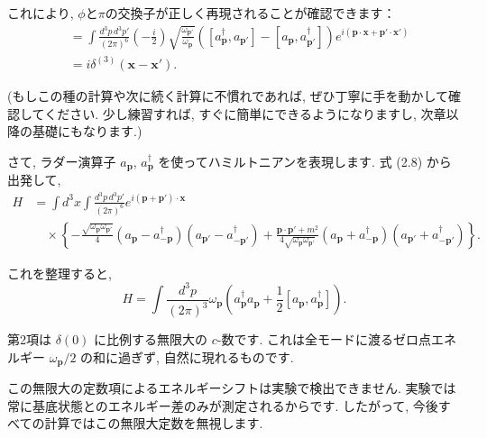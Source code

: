 \documentclass[a4paper,12pt]{article}
\begin{document}
これにより, $\phi$と$\pi$の交換子が正しく再現されることが確認できます：
\begin{align*}
[\phi(\mathbf{x}), \pi(\mathbf{x}')] &= \int \frac{d^3p\, d^3p'}{(2\pi)^6} \left( -\frac{i}{2} \right) \sqrt{\frac{\omega_{\mathbf{p}'}}{\omega_{\mathbf{p}}}}
\left( [a^\dagger_{\mathbf{p}}, a_{\mathbf{p}'}] - [a_{\mathbf{p}}, a^\dagger_{\mathbf{p}'}] \right)
e^{i(\mathbf{p}\cdot\mathbf{x} + \mathbf{p}'\cdot\mathbf{x}')} \\
&= i\delta^{(3)}(\mathbf{x} - \mathbf{x}') .
\end{align*}

(もしこの種の計算や次に続く計算に不慣れであれば, ぜひ丁寧に手を動かして確認してください.  
少し練習すれば, すぐに簡単にできるようになりますし, 次章以降の基礎にもなります.)

\vspace{0.5em}

さて, ラダー演算子 $a_{\mathbf{p}}$, $a^\dagger_{\mathbf{p}}$ を使ってハミルトニアンを表現します.  
式 (2.8) から出発して,
\begin{align*}
H &= \int d^3x \int \frac{d^3p\, d^3p'}{(2\pi)^6} e^{i(\mathbf{p}+\mathbf{p}')\cdot\mathbf{x}} \\
&\quad \times \left\{ -\frac{\sqrt{\omega_{\mathbf{p}}\omega_{\mathbf{p}'}}}{4} (a_{\mathbf{p}} - a^\dagger_{-\mathbf{p}})(a_{\mathbf{p}'} - a^\dagger_{-\mathbf{p}'})
+ \frac{\mathbf{p}\cdot\mathbf{p}' + m^2}{4\sqrt{\omega_{\mathbf{p}}\omega_{\mathbf{p}'}}} (a_{\mathbf{p}} + a^\dagger_{-\mathbf{p}})(a_{\mathbf{p}'} + a^\dagger_{-\mathbf{p}'}) \right\} .
\end{align*}

これを整理すると,
\begin{equation*}
H = \int \frac{d^3p}{(2\pi)^3} \omega_{\mathbf{p}} \left( a^\dagger_{\mathbf{p}} a_{\mathbf{p}} + \frac{1}{2} [a_{\mathbf{p}}, a^\dagger_{\mathbf{p}}] \right) .
\end{equation*}

第2項は $\delta(0)$ に比例する無限大の $c$-数です.  
これは全モードに渡るゼロ点エネルギー $\omega_{\mathbf{p}}/2$ の和に過ぎず, 自然に現れるものです.

\vspace{0.5em}

この無限大の定数項によるエネルギーシフトは実験で検出できません.  
実験では常に基底状態とのエネルギー差のみが測定されるからです.  
したがって, 今後すべての計算ではこの無限大定数を無視します.

\vspace{0.5em}
\end{document}
